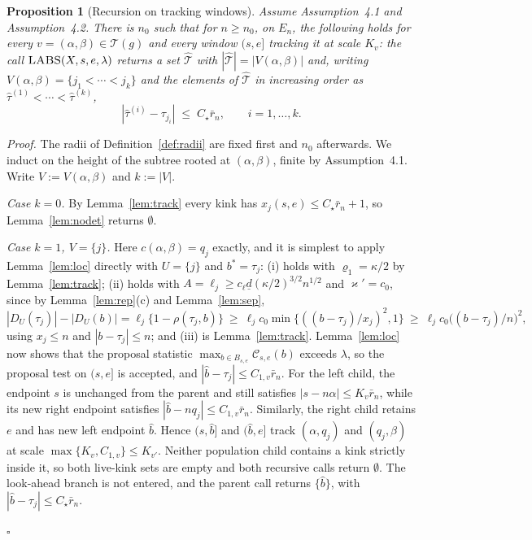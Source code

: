 \documentclass[12pt, a4paper]{article}
\newcommand{\qed}{\hfill$\square$}
\newenvironment{proof}[1][Proof]{\par\noindent\textit{#1.}\space}{\qed\par\medskip}
\newtheorem{prop}{Proposition}[section]
\newcommand{\assterm}{Assumption~4.1}
\newcommand{\assnondeg}{Assumption~4.2}
\begin{document}
\begin{prop}[Recursion on tracking windows]
\label{prop:track_prop}
Assume \assterm{} and \assnondeg{}. There is $n_0$ such
that for $n \ge n_0$, on $E_n$, the following holds for every
$v = (\alpha,\beta) \in \mathcal{T}(g)$ and every window $(s,e]$ tracking it at
scale $K_v$: the call $\textnormal{\textsc{LABS}}(X,s,e,\lambda)$ returns a set
$\hat{\mathcal{T}}$ with $|\hat{\mathcal{T}}| = |V(\alpha,\beta)|$ and, writing
$V(\alpha,\beta) = \{j_1 < \cdots < j_k\}$ and the elements of
$\hat{\mathcal{T}}$ in increasing order as
$\hat\tau^{(1)} < \cdots < \hat\tau^{(k)}$,
\[
|\hat\tau^{(i)} - \tau_{j_i}| \;\le\; C_\star\bar r_n, \qquad i = 1,\ldots,k .
\]
\end{prop}

\begin{proof}
The radii of Definition~\ref{def:radii} are fixed first and $n_0$ afterwards. We induct on the height of the subtree rooted at $(\alpha,\beta)$, finite by
\assterm{}. Write $V := V(\alpha,\beta)$ and $k := |V|$.

\emph{Case $k=0$.} By Lemma~\ref{lem:track} every kink has
$x_j(s,e) \le C_\star\bar r_n + 1$, so Lemma~\ref{lem:nodet} returns
$\emptyset$.

\emph{Case $k=1$, $V = \{j\}$.} Here $c(\alpha,\beta) = q_j$ exactly, and it is
simplest to apply Lemma~\ref{lem:loc} directly with $U = \{j\}$ and
$b^* = \tau_j$: (i) holds with $\varrho_1 = \kappa/2$ by
Lemma~\ref{lem:track}; (ii) holds with $A = \ell_j \ge c_\ell\underline d(\kappa/2)^{3/2}n^{1/2}$ and $\varkappa' = c_0$, since by
Lemma~\ref{lem:rep}(c) and Lemma~\ref{lem:sep},
\[
|D_U(\tau_j)| - |D_U(b)| = \ell_j\{1-\rho(\tau_j,b)\}
\ \ge\ \ell_j c_0 \min\{ ((b-\tau_j)/x_j)^2, 1\} \ \ge\ \ell_j c_0 \big((b-\tau_j)/n\big)^2, \] using $x_j \le n$ and $|b-\tau_j| \le n$; and (iii) is Lemma~\ref{lem:track}.
Lemma~\ref{lem:loc} now shows that the proposal statistic
$\max_{b\in B_{s,e}}\mathcal C_{s,e}(b)$ exceeds $\lambda$, so the proposal
test on $(s,e]$ is accepted, and
$|\hat b-\tau_j|\le C_{1,v}\bar r_n$. For the left child, the endpoint $s$ is
unchanged from the parent and still satisfies
$|s-n\alpha|\le K_v\bar r_n$, while its new right endpoint satisfies
$|\hat b-nq_j|\le C_{1,v}\bar r_n$. Similarly, the right child retains $e$
and has new left endpoint $\hat b$. Hence $(s,\hat b]$ and $(\hat b,e]$ track
$(\alpha,q_j)$ and $(q_j,\beta)$ at scale
$\max\{K_v,C_{1,v}\}\le K_{v'}$. Neither population child contains a kink
strictly inside it, so both live-kink sets are empty and both recursive calls
return $\emptyset$. The look-ahead branch is not entered, and the parent call
returns $\{\hat b\}$, with $|\hat b-\tau_j|\le C_\star\bar r_n$.


\end{proof}
\end{document}
